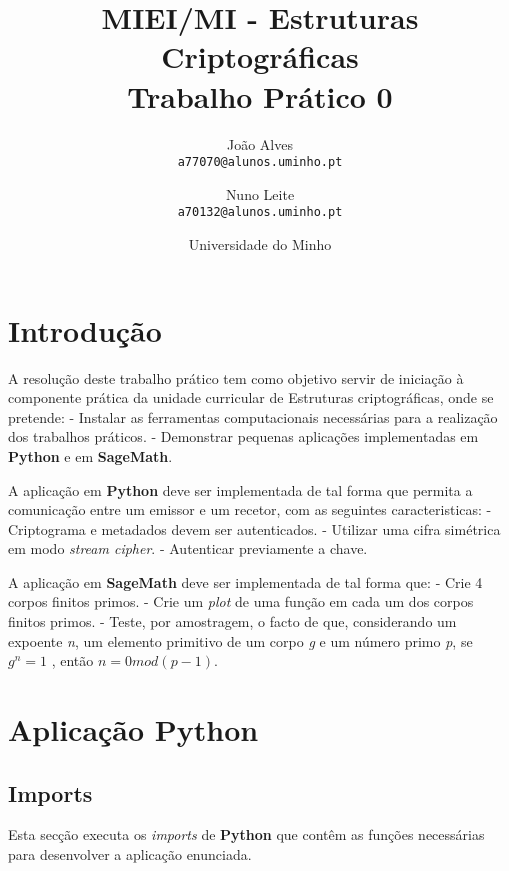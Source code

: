 \documentclass[11pt]{article}
\title{MIEI/MI - Estruturas Criptográficas\\
            \large Trabalho Prático 0}
\author{
        João Alves\\
        \texttt{a77070@alunos.uminho.pt}
        \and
        Nuno Leite\\
        \texttt{a70132@alunos.uminho.pt}
      }
\date{Universidade do Minho}
\begin{document}
    
    
    \maketitle
    
    
    \hypertarget{introduuxe7uxe3o}{%
\section{Introdução}\label{introduuxe7uxe3o}}

    A resolução deste trabalho prático tem como objetivo servir de iniciação
à componente prática da unidade curricular de Estruturas criptográficas,
onde se pretende: - Instalar as ferramentas computacionais necessárias
para a realização dos trabalhos práticos. - Demonstrar pequenas
aplicações implementadas em \textbf{Python} e em \textbf{SageMath}.

A aplicação em \textbf{Python} deve ser implementada de tal forma que
permita a comunicação entre um emissor e um recetor, com as seguintes
caracteristicas: - Criptograma e metadados devem ser autenticados. -
Utilizar uma cifra simétrica em modo \emph{stream cipher}. - Autenticar
previamente a chave.

A aplicação em \textbf{SageMath} deve ser implementada de tal forma que:
- Crie 4 corpos finitos primos. - Crie um \emph{plot} de uma função em
cada um dos corpos finitos primos. - Teste, por amostragem, o facto de
que, considerando um expoente \emph{n}, um elemento primitivo de um
corpo \emph{g} e um número primo \emph{p}, se \(g ^ n = 1\) , então
\(n = 0 mod (p-1)\).

    \hypertarget{aplicauxe7uxe3o-python}{%
\section{Aplicação Python}\label{aplicauxe7uxe3o-python}}

    \hypertarget{imports}{%
\subsection{Imports}\label{imports}}

    Esta secção executa os \emph{imports} de \textbf{Python} que contêm as
funções necessárias para desenvolver a aplicação enunciada.
\end{document}
